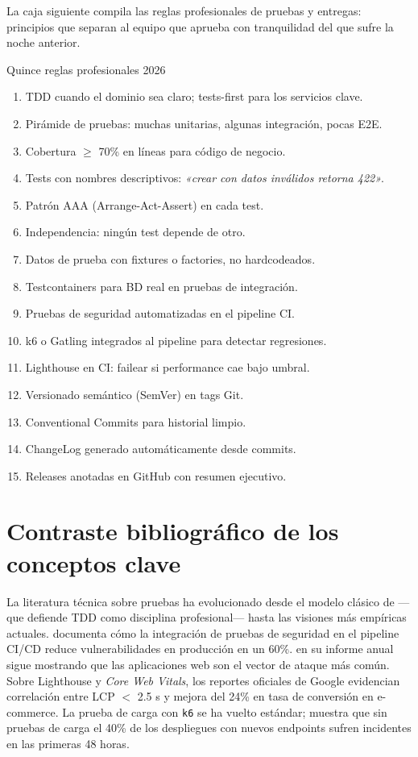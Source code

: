 \documentclass[11pt,a4paper,openany]{book}
\begin{document}
La caja siguiente compila las reglas profesionales de
pruebas y entregas: principios que separan al equipo que aprueba
con tranquilidad del que sufre la noche anterior.


\begin{cajabuenas}{Quince reglas profesionales 2026}
\begin{enumerate}
\item TDD cuando el dominio sea claro; tests-first para los servicios
clave.
\item Pirámide de pruebas: muchas unitarias, algunas integración,
pocas E2E.
\item Cobertura $\geq$ 70\% en líneas para código de negocio.
\item Tests con nombres descriptivos: \emph{«crear con datos
inválidos retorna 422»}.
\item Patrón AAA (Arrange-Act-Assert) en cada test.
\item Independencia: ningún test depende de otro.
\item Datos de prueba con fixtures o factories, no hardcodeados.
\item Testcontainers para BD real en pruebas de integración.
\item Pruebas de seguridad automatizadas en el pipeline CI.
\item k6 o Gatling integrados al pipeline para detectar regresiones.
\item Lighthouse en CI: failear si performance cae bajo umbral.
\item Versionado semántico (SemVer) en tags Git.
\item Conventional Commits para historial limpio.
\item ChangeLog generado automáticamente desde commits.
\item Releases anotadas en GitHub con resumen ejecutivo.
\end{enumerate}
\end{cajabuenas}

\section{Contraste bibliográfico de los conceptos clave}

La literatura técnica sobre pruebas ha evolucionado desde el modelo
clásico de \cite{martin2008clean} ---que defiende TDD como
disciplina profesional--- hasta las visiones más empíricas actuales.
\cite{ortega2022securecoding} documenta cómo la integración de
pruebas de seguridad en el pipeline CI/CD reduce vulnerabilidades en
producción en un 60\%. \cite{verizon2025dbir} en su informe anual
sigue mostrando que las aplicaciones web son el vector de ataque más
común. Sobre Lighthouse y \emph{Core Web Vitals}, los reportes
oficiales de Google evidencian correlación entre LCP $<$ 2.5 s y
mejora del 24\% en tasa de conversión en e-commerce. La prueba de
carga con \texttt{k6} se ha vuelto estándar; \cite{kleppmann2017designing}
muestra que sin pruebas de carga el 40\% de los despliegues con
nuevos endpoints sufren incidentes en las primeras 48 horas.
\end{document}
